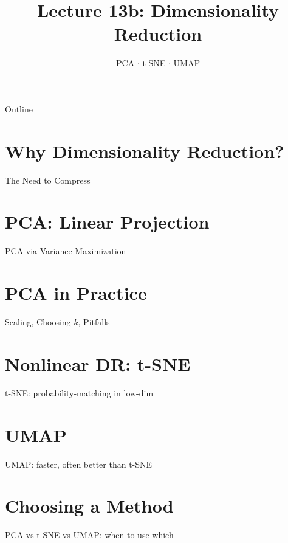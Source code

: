 \documentclass[aspectratio=169]{beamer}
\title{Lecture 13b: Dimensionality Reduction}
\subtitle{PCA $\cdot$ t-SNE $\cdot$ UMAP}
\date{}
\begin{document}
\begin{frame}\titlepage\end{frame}

\begin{frame}{Outline}
  \tableofcontents
\end{frame}

\section{Why Dimensionality Reduction?}
\begin{frame}{The Need to Compress}
\end{frame}

\section{PCA: Linear Projection}
\begin{frame}{PCA via Variance Maximization}
\end{frame}

\section{PCA in Practice}
\begin{frame}{Scaling, Choosing $k$, Pitfalls}
\end{frame}

\section{Nonlinear DR: t-SNE}
\begin{frame}{t-SNE: probability-matching in low-dim}
\end{frame}

\section{UMAP}
\begin{frame}{UMAP: faster, often better than t-SNE}
\end{frame}

\section{Choosing a Method}
\begin{frame}{PCA vs t-SNE vs UMAP: when to use which}
\end{frame}
\end{document}
